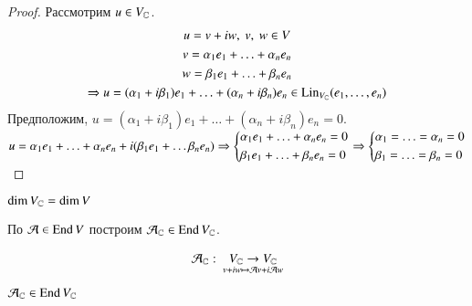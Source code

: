 \documentclass[main]{subfiles}
\begin{document}
\begin{proof}
    Рассмотрим $u \in V_{\mathbb{C}}$.
    \begin{gather*}
        u = v + iw, \ v, \ w \in V \\
        v = \alpha_1 e_1 + \ldots + \alpha_n e_n \\
        w = \beta_1 e_1 + \ldots + \beta_n e_n \\
        \Rightarrow u = (\alpha_1 + i\beta_1) e_1 + \ldots + (\alpha_n + i\beta_n) e_n \in \operatorname{Lin}_{V_{\mathbb{C}}} (e_1, \ldots, e_n)
    \end{gather*} 
    Предположим, $u = (\alpha_1 + i\beta_1) e_1 + \ldots + (\alpha_n + i\beta_n) e_n  = 0$.
    $u = \alpha_1 e_1 + \ldots + \alpha_n e_n + i(\beta_1 e_1 + \ldots \beta_n e_n) \Rightarrow
    \left\{ \begin{gathered} 
          \alpha_1 e_1 + \ldots + \alpha_n e_n = 0 \hfill 
          \\ 
          \beta_1 e_1 + \ldots + \beta_n e_n = 0 \hfill 
          \\ 
        \end{gathered}   \right.\Rightarrow
        \left\{ \begin{gathered} 
            \alpha_1 = \ldots = \alpha_n = 0 \hfill 
            \\ 
            \beta_1 = \ldots  =\beta_n = 0 \hfill 
            \\ 
          \end{gathered} \right.$
\end{proof}

\begin{corollary}
    $\dim V_{\mathbb{C}} = \dim V$
\end{corollary}

По $\mathcal{A} \in \operatorname{End} V$ построим $\mathcal{A}_{\mathbb{C}} \in \operatorname{End} V_{\mathbb{C}}$.

\begin{gather*}
    \mathcal{A}_{\mathbb{C}}: \ \underset{v+iw \mapsto \mathcal{A} v + i \mathcal{A} w}{V_{\mathbb{C}} \rightarrow V_{\mathbb{C}}}
\end{gather*}

\begin{proposition}
    $\mathcal{A}_{\mathbb{C}} \in \operatorname{End} V_{\mathbb{C}}$
\end{proposition}
\end{document}
